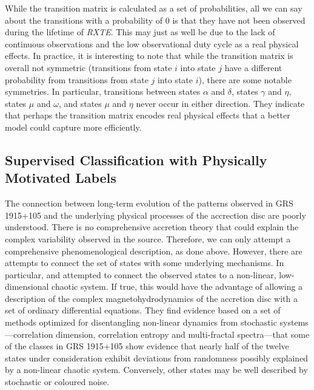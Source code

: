 \documentclass[fleqn,usenatbib]{mnras}
\newcommand{\project}[1]{\textsl{#1}}
\newcommand{\rxte}{\project{RXTE}}
\begin{document}
While the transition matrix is calculated as a set of probabilities, all we can say about the transitions with a probability of $0$ is that they have not been observed 
during the lifetime of \rxte. This may just as well be due to the lack of continuous observations and the low observational duty cycle as a real physical effects.
In practice, it is interesting to note that while the transition matrix is overall not symmetric (transitions from state $i$ into state $j$ have a different probability from 
transitions from state $j$ into state $i$), there are some notable symmetries.
In particular, transitions between states $\alpha$ and $\delta$, states $\gamma$ and $\eta$, states $\mu$ and $\omega$, and states $\mu$ and $\eta$ never occur in either direction. They indicate that perhaps the transition matrix encodes real physical effects that a better model could capture more efficiently.

\subsection{Supervised Classification with Physically Motivated Labels}

The connection between long-term evolution of the patterns observed in GRS 1915+105 and the underlying physical processes of the 
accrection disc are poorly understood. There is no comprehensive accretion theory that could explain the complex variability observed in the source. 
Therefore, we can only attempt a comprehensive phenomenological description, as done above.
However, there are attempts to connect the set of 
states with some underlying mechanisms. In particular, \citet{misra2004,misra2006} and \citet{harikrishnan2011} attempted to connect the observed states to 
a non-linear, low-dimensional chaotic system. If true, this would have the advantage of allowing a description of the complex magnetohydrodynamics of the 
accretion disc with a set of ordinary differential equations. They find evidence based on a set of methods optimized for disentangling non-linear dynamics from 
stochastic systems---correlation dimension, correlation entropy and multi-fractal spectra---that some of the classes in GRS 1915+105 show evidence that nearly 
half of the twelve states under consideration exhibit deviations from randomness possibly explained by a non-linear chaotic system. Conversely, other states may 
be well described by stochastic or coloured noise.
\end{document}
